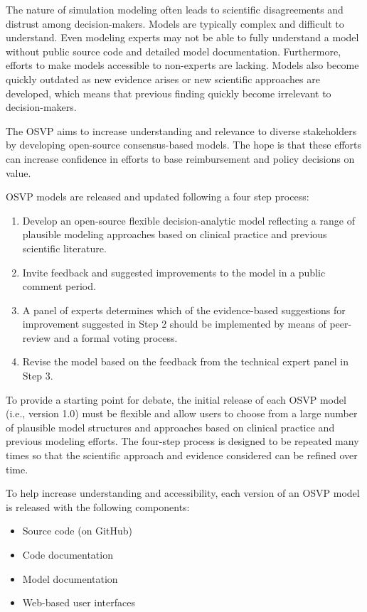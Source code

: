 \documentclass[11pt,final,fleqn]{article}\usepackage[]{graphicx}\usepackage[]{color}
\theoremstyle{plain}
\begin{document}
The nature of simulation modeling often leads to scientific disagreements and distrust among decision-makers. Models are typically complex and difficult to understand. Even modeling experts may not be able to fully understand a model without public source code and detailed model documentation. Furthermore, efforts to make models accessible to non-experts are lacking. Models also become quickly outdated as new evidence arises or new scientific approaches are developed, which means that previous finding quickly become irrelevant to decision-makers.

The OSVP aims to increase understanding and relevance to diverse stakeholders by developing open-source consensus-based models. The hope is that these efforts can increase confidence in efforts to base reimbursement and policy decisions on value.

OSVP models are released and updated following a four step process:

\begin{enumerate}
\item Develop an open-source flexible decision-analytic model reflecting a range of plausible modeling approaches based on clinical practice and previous scientific literature.
\item Invite feedback and suggested improvements to the model in a public comment period.
\item A panel of experts determines which of the evidence-based suggestions for improvement suggested in Step 2 should be implemented by means of peer-review and a formal voting process. 
\item Revise the model based on the feedback from the technical expert panel in Step 3. 
\end{enumerate}

To provide a starting point for debate, the initial release of each OSVP model (i.e., version 1.0) must be flexible and allow users to choose from a large number of plausible model structures and approaches based on clinical practice and previous modeling efforts. The four-step process is designed to be repeated many times so that the scientific approach and evidence considered can be refined over time.

To help increase understanding and accessibility, each version of an OSVP model is released with the following components:

\begin{itemize}
\item Source code (on GitHub)
\item Code documentation
\item Model documentation
\item Web-based user interfaces
\end{itemize}
\end{document}
